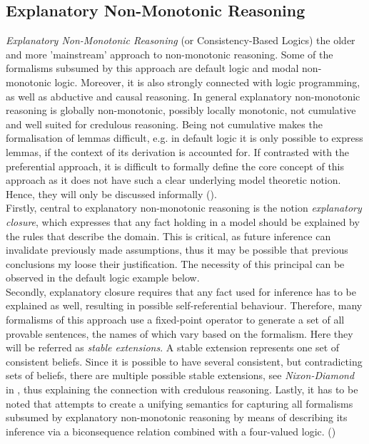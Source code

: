 \documentclass{extarticle}
\begin{document}
\subsection{Explanatory Non-Monotonic Reasoning}
\emph{Explanatory Non-Monotonic Reasoning} (or Consistency-Based Logics) the older and more 'mainstream' approach to non-monotonic reasoning. Some of the formalisms subsumed by this approach are default logic and modal non-monotonic logic. Moreover, it is also strongly connected with logic programming, as well as abductive and causal reasoning. 
In general explanatory non-monotonic reasoning is globally non-monotonic, possibly locally monotonic, not cumulative and well suited for credulous reasoning. Being not cumulative makes the formalisation of lemmas difficult, e.g. in default logic it is only possible to express lemmas, if the context of its derivation is accounted for. 
If contrasted with the preferential approach, it is difficult to formally define the core concept of this approach as it does not have such a clear underlying model theoretic notion. Hence, they will only be discussed informally (\cite{BOCHMAN2007557,brewka1997nonmonotonic,bochman2005explanatory}).\\

Firstly, central to explanatory non-monotonic reasoning is the notion \emph{explanatory closure}, which expresses that any fact holding in a model should be explained by the rules that describe the domain. This is critical, as future inference can invalidate previously made assumptions, thus it may be possible that previous conclusions my loose their justification. The necessity of this principal can be observed in the default logic example below. \\

Secondly, explanatory closure requires that any fact used for inference has to be explained as well, resulting in possible self-referential behaviour. Therefore, many formalisms of this approach use a fixed-point operator to generate a set of all provable sentences, the names of which vary based on the formalism. Here they will be referred as \emph{stable extensions}. A stable extension represents one set of consistent beliefs. Since it is possible to have several consistent, but contradicting sets of beliefs, there are multiple possible stable extensions, see \emph{Nixon-Diamond} in \cite{nonmonoton_stanford2018}, thus explaining the connection 
with credulous reasoning. Lastly, it has to be noted that \cite{bochman2005explanatory} attempts to create a unifying semantics for capturing all formalisms subsumed by explanatory non-monotonic reasoning by means of describing its inference via a biconsequence relation combined with a four-valued logic. (\cite{BOCHMAN2007557,brewka1997nonmonotonic,bochman2005explanatory})
\end{document}
